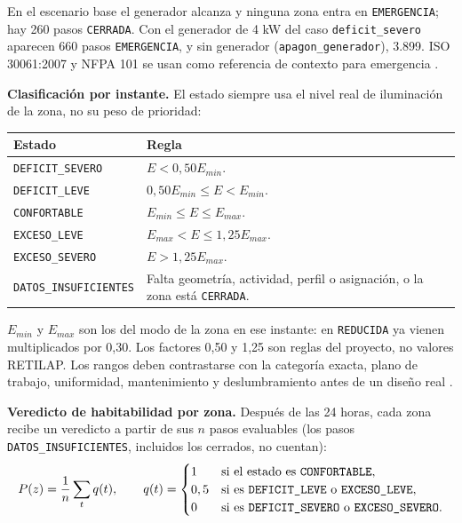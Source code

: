 \documentclass[12pt,a4paper]{article}
\newcommand{\estado}[1]{\texttt{#1}}
\newcommand{\codigo}[1]{\texttt{#1}}
\begin{document}
En el escenario base el generador alcanza y ninguna zona entra en \estado{EMERGENCIA}; hay 260 pasos \estado{CERRADA}. Con el generador de 4 kW del caso \codigo{deficit\_severo} aparecen 660 pasos \estado{EMERGENCIA}, y sin generador (\codigo{apagon\_generador}), 3.899. ISO 30061:2007 y NFPA 101 se usan como referencia de contexto para emergencia \cite{isoEmergency,nfpa101}.

\textbf{Clasificación por instante.} El estado siempre usa el nivel real de iluminación de la zona, no su peso de prioridad:

\begin{center}\small
\begin{tabular}{p{}p{}}
\toprule
\textbf{Estado} & \textbf{Regla}\\
\midrule
\estado{DEFICIT\_SEVERO} & $E<0,50E_{min}$.\\
\estado{DEFICIT\_LEVE} & $0,50E_{min}\leq E<E_{min}$.\\
\estado{CONFORTABLE} & $E_{min}\leq E\leq E_{max}$.\\
\estado{EXCESO\_LEVE} & $E_{max}<E\leq1,25E_{max}$.\\
\estado{EXCESO\_SEVERO} & $E>1,25E_{max}$.\\
\estado{DATOS\_INSUFICIENTES} & Falta geometría, actividad, perfil o asignación, o la zona está \estado{CERRADA}.\\
\bottomrule
\end{tabular}
\end{center}

$E_{min}$ y $E_{max}$ son los del modo de la zona en ese instante: en \estado{REDUCIDA} ya vienen multiplicados por 0,30. Los factores 0,50 y 1,25 son reglas del proyecto, no valores RETILAP. Los rangos deben contrastarse con la categoría exacta, plano de trabajo, uniformidad, mantenimiento y deslumbramiento antes de un diseño real \cite{retilap,en12464}.

\textbf{Veredicto de habitabilidad por zona.} Después de las 24 horas, cada zona recibe un veredicto a partir de sus $n$ pasos evaluables (los pasos \estado{DATOS\_INSUFICIENTES}, incluidos los cerrados, no cuentan):
\begin{equation}
 P(z)=\frac{1}{n}\sum_{t}q(t),\qquad
 q(t)=\begin{cases}
 1 & \text{si el estado es \estado{CONFORTABLE}},\\
 0,5 & \text{si es \estado{DEFICIT\_LEVE} o \estado{EXCESO\_LEVE}},\\
 0 & \text{si es \estado{DEFICIT\_SEVERO} o \estado{EXCESO\_SEVERO}}.
 \end{cases}
 \label{eq:puntaje}
\end{equation}
\end{document}
